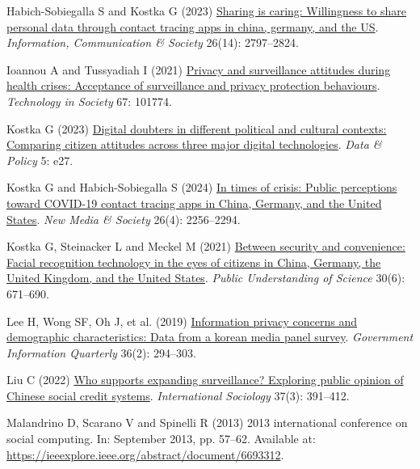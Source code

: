 \documentclass[
  letterpaper,
  DIV=11,
  numbers=noendperiod]{scrartcl}
\newlength{\cslhangindent}
\newenvironment{CSLReferences}[2] %
 {\begin{list}{}{%
  \setlength{\itemindent}{0pt}
  \setlength{\leftmargin}{0pt}
  \setlength{\parsep}{0pt}
  \ifodd #1
   \setlength{\leftmargin}{\cslhangindent}
   \setlength{\itemindent}{-1\cslhangindent}
  \fi
  \setlength{\itemsep}{#2\baselineskip}}}
 {\end{list}}
\begin{document}
\begin{CSLReferences}{1}{1}
Habich-Sobiegalla S and Kostka G (2023)
\href{https://doi.org/10.1080/1369118X.2022.2113421}{Sharing is caring:
Willingness to share personal data through contact tracing apps in
china, germany, and the US}. \emph{Information, Communication \&
Society} 26(14): 2797--2824.

Ioannou A and Tussyadiah I (2021)
\href{https://doi.org/10.1016/j.techsoc.2021.101774}{Privacy and
surveillance attitudes during health crises: Acceptance of surveillance
and privacy protection behaviours}. \emph{Technology in Society} 67:
101774.

Kostka G (2023) \href{https://doi.org/10.1017/dap.2023.25}{Digital
doubters in different political and cultural contexts: Comparing citizen
attitudes across three major digital technologies}. \emph{Data \&
Policy} 5: e27.

Kostka G and Habich-Sobiegalla S (2024)
\href{https://doi.org/10.1177/14614448221083285}{In times of crisis:
Public perceptions toward COVID-19 contact tracing apps in China,
Germany, and the United States}. \emph{New Media \& Society} 26(4):
2256--2294.

Kostka G, Steinacker L and Meckel M (2021)
\href{https://doi.org/10.1177/09636625211001555}{Between security and
convenience: Facial recognition technology in the eyes of citizens in
China, Germany, the United Kingdom, and the United States}. \emph{Public
Understanding of Science} 30(6): 671--690.

Lee H, Wong SF, Oh J, et al. (2019)
\href{https://doi.org/10.1016/j.giq.2019.01.002}{Information privacy
concerns and demographic characteristics: Data from a korean media panel
survey}. \emph{Government Information Quarterly} 36(2): 294--303.

Liu C (2022) \href{https://doi.org/10.1177/02685809221084446}{Who
supports expanding surveillance? Exploring public opinion of Chinese
social credit systems}. \emph{International Sociology} 37(3): 391--412.

Malandrino D, Scarano V and Spinelli R (2013) 2013 international
conference on social computing. In: September 2013, pp. 57--62.
Available at:
\url{https://ieeexplore.ieee.org/abstract/document/6693312}.


\end{CSLReferences}
\end{document}
